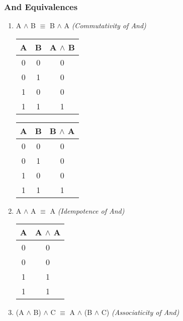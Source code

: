 \documentclass[11pt]{article}
\begin{document}
\subsubsection{And Equivalences}
\begin{enumerate}
  \item A $\land$ B $\equiv$ B $\land$ A \emph{(Commutativity of And)}

\begin{tabular}{| c | c | c |}
  \hline
  A & B & A $\land$ B \\ \hline
  0 & 0 & 0 \\
  0 & 1 & 0 \\
  1 & 0 & 0 \\
  1 & 1 & 1 \\ \hline
\end{tabular}
\quad
\begin{tabular}{| c | c | c |}
  \hline
  A & B & B $\land$ A \\ \hline
  0 & 0 & 0 \\
  0 & 1 & 0 \\
  1 & 0 & 0 \\
  1 & 1 & 1 \\ \hline
\end{tabular}

  \item A $\land$ A $\equiv$ A \emph{(Idempotence of And)}

\begin{tabular}{| c | c |}
  \hline
  A & A $\land$ A \\ \hline
  0 & 0 \\
  0 & 0 \\
  1 & 1 \\
  1 & 1 \\ \hline
\end{tabular}

  \item (A $\land$ B) $\land$ C $\equiv$ A $\land$ (B $\land$ C) \emph{(Associaticity of And)}


\end{enumerate}
\end{document}

